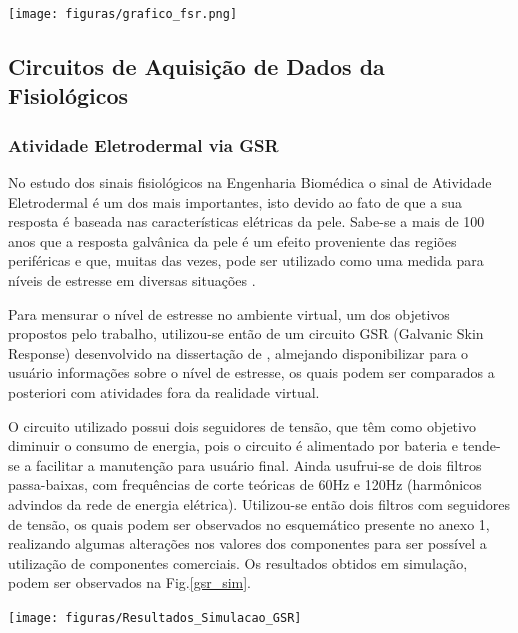             \begin{center}
   	\texttt{[image: figuras/grafico\_fsr.png]}
        \label{graf_fsr}
   \end{center}


\subsection{Circuitos de Aquisição de Dados da Fisiológicos}

\subsubsection{Atividade Eletrodermal via GSR}
    No estudo dos sinais fisiológicos na Engenharia Biomédica o sinal de Atividade Eletrodermal é um dos mais importantes, isto devido ao fato de que a sua resposta é baseada nas características elétricas da pele. Sabe-se a mais de 100 anos \cite{eletrodermal_1} que a resposta galvânica da pele é um efeito proveniente das regiões periféricas e que, muitas das vezes, pode ser utilizado como uma medida para níveis de estresse em diversas situações \cite{eletrodermal_2}.

	Para mensurar o nível de estresse no ambiente virtual, um dos objetivos propostos pelo trabalho, utilizou-se então de um circuito GSR (Galvanic Skin Response) desenvolvido na dissertação de \cite{miranda2015}, almejando disponibilizar para o usuário informações sobre o nível de estresse, os quais podem ser comparados a posteriori com atividades fora da realidade virtual.

	O circuito utilizado possui dois seguidores de tensão, que têm como objetivo diminuir o consumo de energia, pois o circuito é alimentado por bateria e tende-se a facilitar a manutenção para usuário final. Ainda usufrui-se de dois filtros passa-baixas, com frequências de corte teóricas de 60Hz e 120Hz (harmônicos advindos da rede de energia elétrica). Utilizou-se então dois filtros com seguidores de tensão, os quais podem ser observados no esquemático presente no anexo 1, realizando algumas alterações nos valores dos componentes para ser possível a utilização de componentes comerciais.
	Os resultados obtidos em simulação, podem ser observados na Fig.\ref{gsr_sim}.

    \begin{center}
    	\texttt{[image: figuras/Resultados\_Simulacao\_GSR]}
        \label{gsr_sim}
    \end{center}

